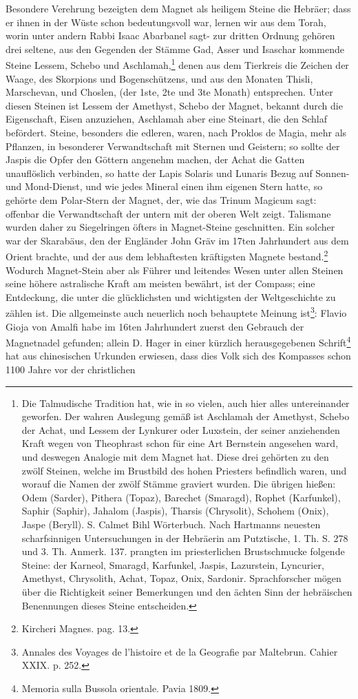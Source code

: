 \documentclass[a4paper, 11pt, oneside, polutonikogreek, german]{article}
\begin{document}
Besondere Verehrung bezeigten dem Magnet als heiligem Steine die Hebräer; dass er ihnen in der Wüste schon bedeutungsvoll war, lernen wir aus dem Torah, worin unter andern Rabbi Isaac Abarbanel sagt- zur dritten Ordnung gehören drei seltene, aus den Gegenden der Stämme Gad, Asser und Isaschar kommende Steine Lessem, Schebo und Aschlamah,\footnote{Die Talmudische Tradition hat, wie in so vielen, auch hier alles untereinander geworfen. Der wahren Auslegung gemäß ist Aschlamah der Amethyst, Schebo der Achat, und Lessem der Lynkurer oder Luxstein, der seiner anziehenden Kraft wegen von Theophrast schon für eine Art Bernstein angesehen ward, und deswegen Analogie mit dem Magnet hat. Diese drei gehörten zu den zwölf Steinen, welche im Brustbild des hohen Priesters befindlich waren, und worauf die Namen der zwölf Stämme graviert wurden. Die übrigen hießen: Odem (Sarder), Pithera (Topaz), Barechet (Smaragd), Rophet (Karfunkel), Saphir (Saphir), Jahalom (Jaspis), Tharsis (Chrysolit), Schohem (Onix), Jaspe (Beryll). S. Calmet Bihl Wörterbuch. Nach Hartmanns neuesten scharfsinnigen Untersuchungen in der Hebräerin am Putztische, 1. Th. S. 278 und 3. Th. Anmerk. 137. prangten im priesterlichen Brustschmucke folgende Steine: der Karneol, Smaragd, Karfunkel, Jaspis, Lazurstein, Lyncurier, Amethyst, Chrysolith, Achat, Topaz, Onix, Sardonir. Sprachforscher mögen über die Richtigkeit seiner Bemerkungen und den ächten Sinn der hebräischen Benennungen dieses Steine entscheiden.} denen aus dem Tierkreis die Zeichen der Waage, des Skorpions und Bogenschützens, und aus den Monaten Thisli, Marschevan, und Choslen, (der 1ste, 2te und 3te Monath) entsprechen. Unter diesen Steinen ist Lessem der Amethyst, Schebo der Magnet, bekannt durch die Eigenschaft, Eisen anzuziehen, Aschlamah aber eine Steinart, die den Schlaf befördert. Steine, besonders die edleren, waren, nach Proklos de Magia, mehr als Pflanzen, in besonderer Verwandtschaft mit Sternen und Geistern; so sollte der Jaspis die Opfer den Göttern angenehm machen, der Achat die Gatten unauflöslich verbinden, so hatte der Lapis Solaris und Lunaris Bezug auf Sonnen- und Mond-Dienst, und wie jedes Mineral einen ihm eigenen Stern hatte, so gehörte dem Polar-Stern der Magnet, der, wie das Trinum Magicum sagt: offenbar die Verwandtschaft der untern mit der oberen Welt zeigt. Talismane wurden daher zu Siegelringen öfters in Magnet-Steine geschnitten. Ein solcher war der Skarabäus, den der Engländer John Gräv im 17ten Jahrhundert aus dem Orient brachte, und der aus dem lebhaftesten kräftigsten Magnete bestand.\footnote{Kircheri Magnes. pag. 13.} Wodurch Magnet-Stein aber als Führer und leitendes Wesen unter allen Steinen seine höhere astralische Kraft am meisten bewährt, ist der Compass; eine Entdeckung, die unter die glücklichsten und wichtigsten der Weltgeschichte zu zählen ist. Die allgemeinste auch neuerlich noch behauptete Meinung ist\footnote{Annales des Voyages de l'histoire et de la Geografie par Maltebrun. Cahier XXIX. p. 252.}: Flavio Gioja von Amalfi habe im 16ten Jahrhundert zuerst den Gebrauch der Magnetnadel gefunden; allein D. Hager in einer kürzlich herausgegebenen Schrift\footnote{Memoria sulla Bussola orientale. Pavia 1809.} hat aus chinesischen Urkunden erwiesen, dass dies Volk sich des Kompasses schon 1100 Jahre vor der christlichen 
\end{document}
